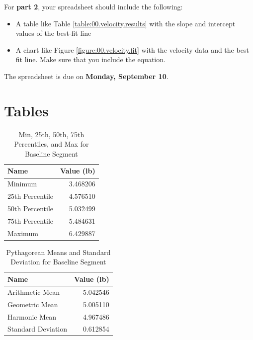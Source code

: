 For \textbf{part 2}, your spreadsheet should include the following:
\begin{itemize}
    \item A table like Table \ref{table:00.velocity.results} with the slope and intercept values of the best-fit line
    \item A chart like Figure \ref{figure:00.velocity.fit} with the velocity data and the best fit line. Make sure that you include the equation.
\end{itemize}
The spreadsheet is due on \textbf{Monday, September 10}.
\newpage
\section{Tables}
\begin{table}[ht]
    \centering
	\begin{tabular}{|l|r|} \hline
        \textbf{Name} & \textbf{Value (lb)} \\
        \hline
		Minimum & 3.468206 \\
		25th Percentile & 4.576510 \\
		50th Percentile & 5.032499 \\
		75th Percentile & 5.484631 \\
		Maximum & 6.429887 \\
		\hline
	\end{tabular}
    \caption{Min, 25th, 50th, 75th Percentiles, and Max for Baseline Segment}
    \label{table:00.baseline.descriptive}
\end{table}
\begin{table}[ht]
    \centering
	\begin{tabular}{|l|r|} \hline
		\textbf{Name} & \textbf{Value (lb)} \\
        \hline
		Arithmetic Mean & 5.042546 \\
		Geometric Mean & 5.005110 \\
        Harmonic Mean & 4.967486 \\
        \hline
        Standard Deviation & 0.612854 \\
		\hline
	\end{tabular}
    \caption{Pythagorean Means and Standard Deviation for Baseline Segment}
    \label{table:00.baseline.means}
\end{table}
